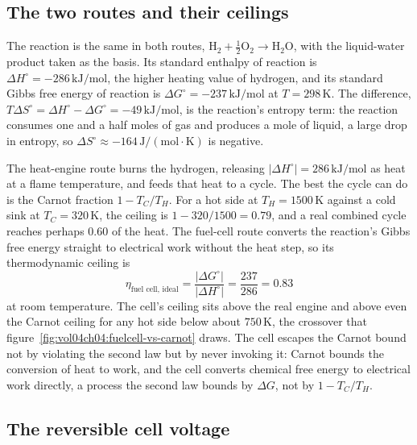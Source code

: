 \subsection{The two routes and their ceilings}

The reaction is the same in both routes, $\text{H}_2 + \tfrac12\text{O}_2
\rightarrow \text{H}_2\text{O}$, with the liquid-water product taken as the
basis. Its standard enthalpy of reaction is $\Delta H^\circ =
-286\,\text{kJ}/\text{mol}$, the higher heating value of hydrogen, and its
standard Gibbs free energy of reaction is $\Delta G^\circ =
-237\,\text{kJ}/\text{mol}$ at $T = 298\,\si{\kelvin}$. The difference,
$T\Delta S^\circ = \Delta H^\circ - \Delta G^\circ = -49\,\text{kJ}/\text{mol}$,
is the reaction's entropy term: the reaction consumes one and a half moles of
gas and produces a mole of liquid, a large drop in entropy, so $\Delta S^\circ
\approx -164\,\text{J}/(\text{mol}\cdot\si{\kelvin})$ is negative.

The heat-engine route burns the hydrogen, releasing $|\Delta H^\circ| =
286\,\text{kJ}/\text{mol}$ as heat at a flame temperature, and feeds that heat
to a cycle. The best the cycle can do is the Carnot fraction $1 - T_C/T_H$. For
a hot side at $T_H = 1500\,\si{\kelvin}$ against a cold sink at $T_C =
320\,\si{\kelvin}$, the ceiling is $1 - 320/1500 = 0.79$, and a real combined
cycle reaches perhaps $0.60$ of the heat. The fuel-cell route converts the
reaction's Gibbs free energy straight to electrical work without the heat step,
so its thermodynamic ceiling is
\[
\eta_{\text{fuel cell, ideal}} = \frac{|\Delta G^\circ|}{|\Delta H^\circ|}
= \frac{237}{286} = 0.83
\]
at room temperature. The cell's ceiling sits above the real engine and above
even the Carnot ceiling for any hot side below about $750\,\si{\kelvin}$, the
crossover that figure~\ref{fig:vol04ch04:fuelcell-vs-carnot} draws. The cell
escapes the Carnot bound not by violating the second law but by never invoking
it: Carnot bounds the conversion of heat to work, and the cell converts chemical
free energy to electrical work directly, a process the second law bounds by
$\Delta G$, not by $1 - T_C/T_H$.

\subsection{The reversible cell voltage}

